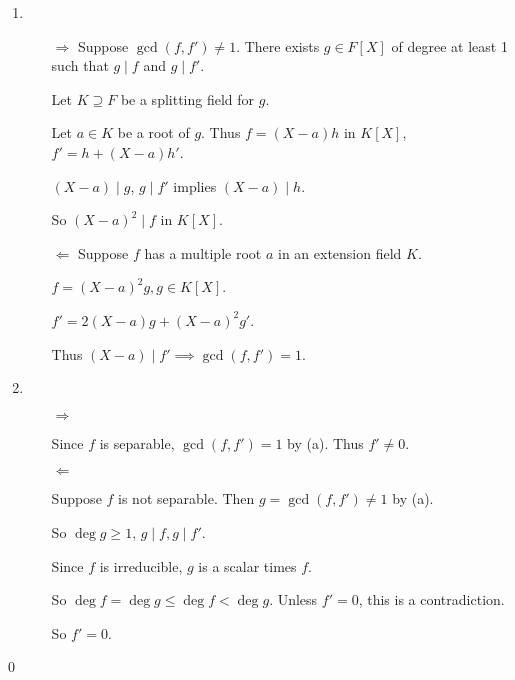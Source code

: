 \documentclass[x11names,reqno,14pt]{extarticle}
\begin{document}
\begin{enumerate}[label=(\alph*)]

\item

\begin{itemize}

\item[$\Rightarrow$] Suppose $\gcd(f, f') \neq 1$. There exists $g \in F[X]$ of degree at least 1 such that $g \mid f$ and $g \mid f'$. 

Let $K \supseteq F$ be a splitting field for $g$. 

Let $a \in K$ be a root of $g$. Thus $f = (X - a)h$ in $K[X]$, $f' = h + (X - a)h'$. 

$(X - a) \mid g$, $g \mid f'$ implies $(X -a ) \mid h$. 

So $(X - a)^2\mid f$ in $K[X]$.

\item[$\Leftarrow$] Suppose $f$ has a multiple root $a$ in an extension field $K$. 

$f = (X - a)^2g, g \in K[X]$. 

$f' = 2(X -a)g + (X - a)^2g'$. 

Thus $(X - a)\mid f' \implies \gcd(f, f') = 1$. 

\end{itemize}

\item

\begin{itemize}

\item[$\Rightarrow$]

Since $f$ is separable, $\gcd(f, f') = 1$ by (a). Thus $f' \neq 0$. 

\item[$\Leftarrow$]

Suppose $f$ is not separable. Then $g = \gcd(f, f') \neq 1$ by (a). 

So $\deg g \geq 1$, $g \mid f, g \mid f'$. 

Since $f$ is irreducible, $g$ is a scalar times $f$. 

So $\deg f = \deg g \leq \deg f < \deg g$. Unless $f' = 0$, this is a contradiction. 

So $f' = 0$. 

\end{itemize}

\end{enumerate}

\qed
\end{document}

